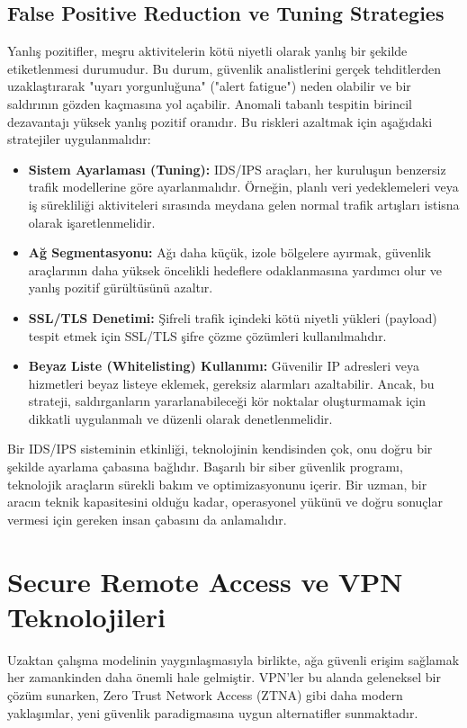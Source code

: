 \subsection{False Positive Reduction ve Tuning Strategies}

Yanlış pozitifler, meşru aktivitelerin kötü niyetli olarak yanlış bir şekilde etiketlenmesi durumudur. Bu durum, güvenlik analistlerini gerçek tehditlerden uzaklaştırarak "uyarı yorgunluğuna" ("alert fatigue") neden olabilir ve bir saldırının gözden kaçmasına yol açabilir. Anomali tabanlı tespitin birincil dezavantajı yüksek yanlış pozitif oranıdır.
Bu riskleri azaltmak için aşağıdaki stratejiler uygulanmalıdır:

\begin{itemize}
\item \textbf{Sistem Ayarlaması (Tuning):} IDS/IPS araçları, her kuruluşun benzersiz trafik modellerine göre ayarlanmalıdır. Örneğin, planlı veri yedeklemeleri veya iş sürekliliği aktiviteleri sırasında meydana gelen normal trafik artışları istisna olarak işaretlenmelidir.
\item \textbf{Ağ Segmentasyonu:} Ağı daha küçük, izole bölgelere ayırmak, güvenlik araçlarının daha yüksek öncelikli hedeflere odaklanmasına yardımcı olur ve yanlış pozitif gürültüsünü azaltır.
\item \textbf{SSL/TLS Denetimi:} Şifreli trafik içindeki kötü niyetli yükleri (payload) tespit etmek için SSL/TLS şifre çözme çözümleri kullanılmalıdır.
\item \textbf{Beyaz Liste (Whitelisting) Kullanımı:} Güvenilir IP adresleri veya hizmetleri beyaz listeye eklemek, gereksiz alarmları azaltabilir. Ancak, bu strateji, saldırganların yararlanabileceği kör noktalar oluşturmamak için dikkatli uygulanmalı ve düzenli olarak denetlenmelidir.
\end{itemize}

Bir IDS/IPS sisteminin etkinliği, teknolojinin kendisinden çok, onu doğru bir şekilde ayarlama çabasına bağlıdır. Başarılı bir siber güvenlik programı, teknolojik araçların sürekli bakım ve optimizasyonunu içerir. Bir uzman, bir aracın teknik kapasitesini olduğu kadar, operasyonel yükünü ve doğru sonuçlar vermesi için gereken insan çabasını da anlamalıdır.

\section{Secure Remote Access ve VPN Teknolojileri}

Uzaktan çalışma modelinin yaygınlaşmasıyla birlikte, ağa güvenli erişim sağlamak her zamankinden daha önemli hale gelmiştir. VPN'ler bu alanda geleneksel bir çözüm sunarken, Zero Trust Network Access (ZTNA) gibi daha modern yaklaşımlar, yeni güvenlik paradigmasına uygun alternatifler sunmaktadır.

